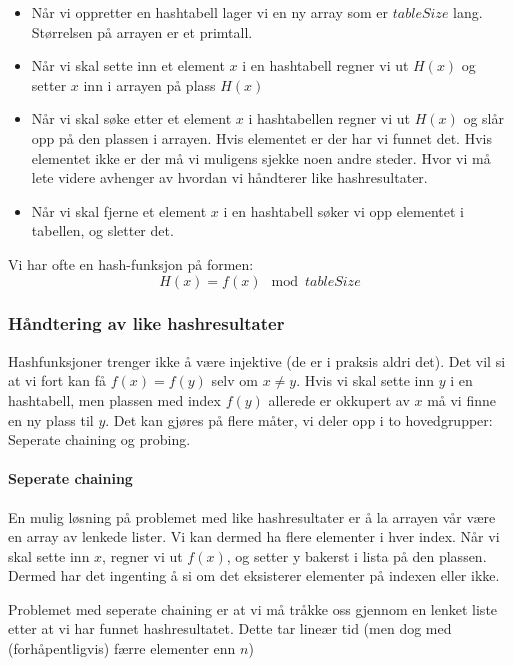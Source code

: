 \begin{itemize}
\item Når vi oppretter en hashtabell lager vi en ny array som er $ tableSize $ lang. Størrelsen på arrayen er et primtall. 
\item Når vi skal sette inn et element $ x $ i en hashtabell regner vi ut $ H(x) $ og setter $ x $ inn i arrayen på plass $ H(x) $
\item Når vi skal søke etter et element $ x $ i hashtabellen regner vi ut $ H(x) $ og slår opp på den plassen i arrayen. Hvis elementet er der har vi funnet det. Hvis elementet ikke er der må vi muligens sjekke noen andre steder. Hvor vi må lete videre avhenger av hvordan vi håndterer like hashresultater. 
\item Når vi skal fjerne et element $ x $ i en hashtabell søker vi opp elementet i tabellen, og sletter det. 
\end{itemize}

\noindent Vi har ofte en hash-funksjon på formen:
\[ H(x) = f(x) \mod tableSize \]


\subsubsection{Håndtering av like hashresultater}
Hashfunksjoner trenger ikke å være injektive (de er i praksis aldri det). Det vil si at vi fort kan få $ f(x) = f(y) $ selv om $ x \neq y $. Hvis vi skal sette inn $ y $ i en hashtabell, men plassen med index $ f(y) $ allerede er okkupert av $ x $ må vi finne en ny plass til $ y $. Det kan gjøres på flere måter, vi deler opp i to hovedgrupper: Seperate chaining og probing. 


\paragraph{Seperate chaining}
En mulig løsning på problemet med like hashresultater er å la arrayen vår være en array av lenkede lister. Vi kan dermed ha flere elementer i hver index. Når vi skal sette inn $ x $, regner vi ut $ f(x) $, og setter y bakerst i lista på den plassen. Dermed har det ingenting å si om det eksisterer elementer på indexen eller ikke. 

Problemet med seperate chaining er at vi må tråkke oss gjennom en lenket liste etter at vi har funnet hashresultatet. Dette tar lineær tid (men dog med (forhåpentligvis) færre elementer enn $ n $)


